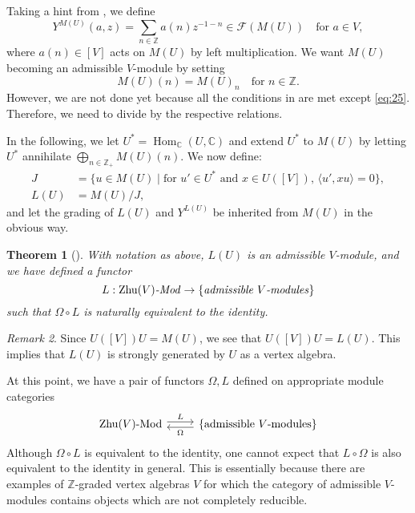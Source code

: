 \documentclass[a4paper, 12pt, reqno]{amsart}
\newtheorem{theorem}{Theorem}[section]
\theoremstyle{remark}
\newtheorem{remark}[theorem]{Remark}
\DeclareMathOperator{\Hom}{Hom}
\DeclareMathOperator{\Zhu}{Zhu}
\begin{document}
Taking a hint from , we define
\begin{equation*}
  Y^{M(U)}(a, z) = \sum_{n \in \mathbb{Z}}a(n)z^{-1 - n} \in \mathcal{F}(M(U)) \quad \text{for $a \in V$},
\end{equation*}
where $a(n) \in [V]$ acts on $M(U)$ by left multiplication.
We want $M(U)$ becoming an admissible $V$-module by setting
\begin{equation*}
  M(U)(n) = M(U)_n \quad \text{for $n \in \mathbb{Z}$}.
\end{equation*}
However, we are not done yet because all the conditions in  are met except \eqref{eq:25}.
Therefore, we need to divide by the respective relations.

In the following, we let $U^* = \Hom_{\mathbb{C}}(U, \mathbb{C})$ and extend $U^*$ to $M(U)$ by letting $U^*$ annihilate $\bigoplus_{n \in \mathbb{Z}_+}M(U)(n)$.
We now define:
\begin{align*}
  J &= \{u \in M(U) \mid \text{for $u' \in U^*$ and $x \in U([V])$, $\langle u', xu\rangle = 0$}\}, \\
  L(U) &= M(U)/J,
\end{align*}
and let the grading of $L(U)$ and $Y^{L(U)}$ be inherited from $M(U)$ in the obvious way.

\begin{theorem}[{\cite[Theorem 6.3]{dong_twisted_1998}}]
  \label{thr:39}
  With notation as above, $L(U)$ is an admissible $V$-module, and we have defined a functor
  \begin{equation*}
    L: \text{\emph{$\Zhu(V)$-Mod}} \to \{\text{\emph{admissible $V$-modules}}\}
  \end{equation*}
  such that $\Omega\circ L$ is naturally equivalent to the identity.
\end{theorem}

\begin{remark}
  \label{rmk:33}
  Since $U([V])U = M(U)$, we see that $U([V])U = L(U)$.
  This implies that $L(U)$ is strongly generated by $U$ as a vertex algebra.
\end{remark}

At this point, we have a pair of functors $\Omega, L$ defined on appropriate module categories
\begin{equation*}
  \begin{tikzcd}
    \text{$\Zhu(V)$-Mod} \arrow[r, "L", shift left] & \{\text{admissible $V$-modules}\} \arrow[l, "\Omega", shift left]
  \end{tikzcd}
\end{equation*}
Although $\Omega\circ L$ is equivalent to the identity, one cannot expect that $L\circ\Omega$ is also equivalent to the identity in general.
This is essentially because there are examples of $\mathbb{Z}$-graded vertex algebras $V$ for which the category of admissible $V$-modules contains objects which are not completely reducible.
\end{document}
